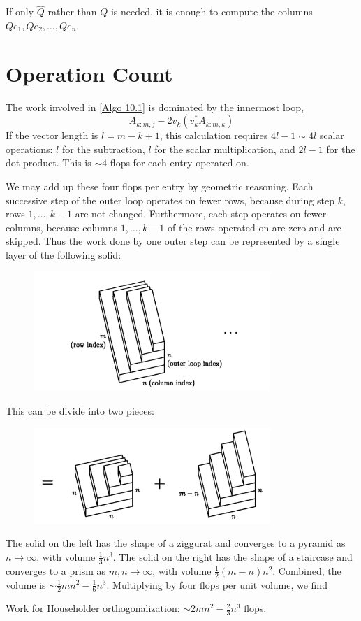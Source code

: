 If only $\hat{Q}$ rather than $Q$ is needed, it is enough to compute the columns $Q e_1, Q e_2, \ldots, Q e_n$.

\section{Operation Count} 
The work involved in \autoref{Algo 10.1} is dominated by the innermost loop,
$$
A_{k: m, j}-2 v_k\left(v_k^* A_{k: m, k}\right)
$$
If the vector length is $l=m-k+1$, this calculation requires $4 l-1 \sim 4 l$ scalar operations: $l$ for the subtraction, $l$ for the scalar multiplication, and $2 l-1$ for the dot product. This is $\sim 4$ flops for each entry operated on.

We may add up these four flops per entry by geometric reasoning. Each successive step of the outer loop operates on fewer rows, because during step $k$, rows $1, \ldots, k-1$ are not changed. Furthermore, each step operates on fewer columns, because columns $1, \ldots, k-1$ of the rows operated on are zero and are skipped. Thus the work done by one outer step can be represented by a single layer of the following solid:
\begin{figure}[H]
    \centering
    \includegraphics[width=0.8\textwidth]{figures/10-4.png}
\end{figure}
This can be divide into two pieces: 

\begin{figure}[H]
    \centering
    \includegraphics[width=0.8\textwidth]{figures/10-5.png}
\end{figure}
The solid on the left has the shape of a ziggurat and converges to a pyramid as $n \rightarrow \infty$, with volume $\frac{1}{3} n^3$. The solid on the right has the shape of a staircase and converges to a prism as $m, n \rightarrow \infty$, with volume $\frac{1}{2}(m-n) n^2$. Combined, the volume is $\sim \frac{1}{2} m n^2-\frac{1}{6} n^3$. Multiplying by four flops per unit volume, we find

\begin{corollary}
    \label{cor: cost of QR}
     Work for Householder orthogonalization: $ \sim 2 m n^2-\frac{2}{3} n^3$  flops. 
\end{corollary}
